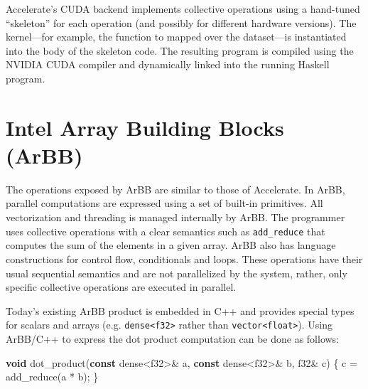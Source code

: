 \documentclass[conference]{IEEEtran}
\newcommand{\cde}[1]{{\footnotesize \tt #1}}
\newcommand{\kw}[1]{{\textbf{#1}}}
\begin{document}
Accelerate's CUDA backend implements collective operations using
a hand-tuned ``skeleton'' for each operation (and possibly for
different hardware versions). The kernel---for example, the function
to mapped over the dataset---is 
instantiated into the body of the skeleton code. The resulting 
program is compiled using the NVIDIA CUDA compiler and dynamically linked 
into the running Haskell program.

\section{Intel Array Building Blocks (ArBB)}
\label{sec:arbb}

The operations exposed by ArBB are similar to those of Accelerate. 
In ArBB, parallel computations are expressed using a set of built-in 
primitives. All vectorization and threading is managed internally by 
ArBB. The programmer uses collective operations with a clear semantics 
such as \cde {add\_reduce} that computes the sum of the elements in a given 
array. ArBB also has language constructions for control flow, conditionals
and loops. These operations have their usual sequential semantics and are not 
parallelized by the system, rather, only specific collective operations are executed
in parallel. 

Today's existing ArBB product is embedded in C++ and provides special
types for scalars and arrays (e.g. \cde{dense<f32>} rather than \cde{vector<float>}).
Using ArBB/C++ to express the dot product computation can be done 
as follows:

\begin{code}
\kw{void} dot\_product(\kw{const} dense<f32>& a, 
                 \kw{const} dense<f32>& b,
                 f32& c) 
\{ 
  c = add\_reduce(a * b);
\}
\end{code} 


\end{document}
